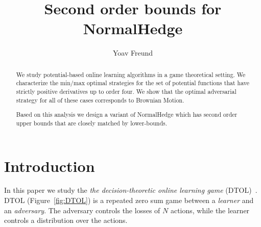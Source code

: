 \documentclass{article}[12pt]
\title{Second order bounds for NormalHedge}
\author{Yoav Freund}
\begin{document}
\maketitle
\begin{abstract}
  We study potential-based online learning algorithms in a game
  theoretical setting. We characterize the min/max optimal strategies
  for the set of potential functions that have strictly positive
  derivatives up to order four. We show that the optimal adversarial
  strategy for all of these cases corresponds to Brownian Motion.

  Based on this analysis we design a variant of NormalHedge which has
  second order upper bounds that are closely matched by lower-bounds.
\end{abstract}

\section{Introduction}
In this paper we study the {\em the decision-theoretic online learning game}
(DTOL)~\cite{freund1997decision}. DTOL (Figure~\ref{fig:DTOL}) is a
repeated zero sum game between a {\em learner} and an {\em
  adversary}. The adversary controls the losses of $N$ actions, while
the learner controls a distribution over the actions.
\newcommand{\Pvec}[1]{\vec{P}^{#1}}
\newcommand{\lvec}[1]{\vec{l}_{#1}}
\newcommand{\Lvec}[1]{\vec{L}_{#1}}
\newcommand{\Rvec}[1]{\vec{R}_{#1}}
\end{document}
